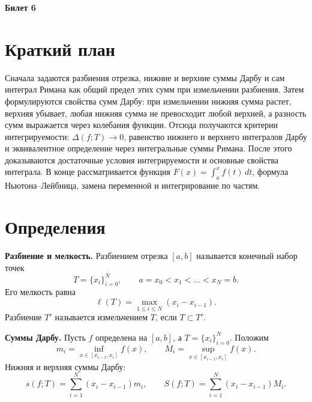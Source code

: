 \documentclass[12pt,a4paper]{article}
\newcommand{\dd}{\,d}
\newcommand{\mesh}{\ell}
\begin{document}
\begin{center}
{\Large\bfseries Билет 6}
\end{center}

\noindent{}

\section*{Краткий план}

Сначала задаются разбиения отрезка, нижние и верхние суммы Дарбу и сам
интеграл Римана как общий предел этих сумм при измельчении разбиения. Затем
формулируются свойства сумм Дарбу: при измельчении нижняя сумма растет,
верхняя убывает, любая нижняя сумма не превосходит любой верхней, а разность
сумм выражается через колебания функции. Отсюда получаются критерии
интегрируемости: \(\Delta(f;T)\to0\), равенство нижнего и верхнего интегралов
Дарбу и эквивалентное определение через интегральные суммы Римана. После этого
доказываются достаточные условия интегрируемости и основные свойства
интеграла. В конце рассматривается функция
\(F(x)=\int_a^x f(t)\dd t\), формула Ньютона--Лейбница, замена переменной и
интегрирование по частям.

\section*{Определения}

\textbf{Разбиение и мелкость.}
Разбиением отрезка \([a,b]\) называется конечный набор точек
\[
  T=\{x_i\}_{i=0}^N,\qquad a=x_0<x_1<\dots<x_N=b.
\]
Его мелкость равна
\[
  \mesh(T)=\max_{1\le i\le N}(x_i-x_{i-1}).
\]
Разбиение \(T'\) называется измельчением \(T\), если \(T\subset T'\).

\textbf{Суммы Дарбу.}
Пусть \(f\) определена на \([a,b]\), а \(T=\{x_i\}_{i=0}^N\). Положим
\[
  m_i=\inf_{x\in[x_{i-1},x_i]} f(x),\qquad
  M_i=\sup_{x\in[x_{i-1},x_i]} f(x).
\]
Нижняя и верхняя суммы Дарбу:
\[
  s(f;T)=\sum_{i=1}^N (x_i-x_{i-1})m_i,\qquad
  S(f;T)=\sum_{i=1}^N (x_i-x_{i-1})M_i.
\]
\end{document}
